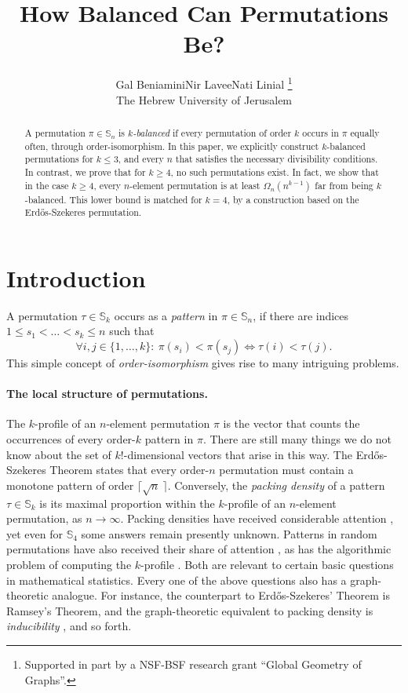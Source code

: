 \documentclass{article}
\title{How Balanced Can Permutations Be?}
\author{Gal Beniamini\qquad Nir Lavee\qquad Nati Linial
\thanks{Supported in part by a NSF-BSF research grant ``Global Geometry of Graphs''.}
\vspace {0.1cm} \\\small The Hebrew University of Jerusalem}
\date{}
\newcommand{\Sn}{\mathbb{S}_n}
\newcommand{\ESZ}{Erd\H{o}s-Szekeres\xspace}
\theoremstyle{remark}
\theoremstyle{plain}
\begin{document}
\maketitle

\vspace{-0.45cm}
\begin{abstract}
A permutation $\pi \in \Sn$ is {\em $k$-balanced} if every permutation of order $k$ occurs in $\pi$ equally often, through order-isomorphism.
In this paper, we explicitly construct $k$-balanced permutations for $k \le 3$, and every $n$
that satisfies the necessary divisibility conditions.
In contrast, we prove that for $k \ge 4$, no such permutations exist.  
In fact, we show that in the case $k \ge 4$, every $n$-element permutation is at least $\Omega_n(n^{k-1})$
far from being $k$-balanced.
This lower bound is matched for $k=4$, by a construction based on the \ESZ permutation.

\end{abstract}

\section{Introduction}
\label{section:introduction}
A permutation $\tau \in \mathbb{S}_k$ occurs as a \textit{pattern} in
$\pi \in \Sn$, if there are indices $1\le s_1 < \dots < s_k\le n$
such that $$\forall i,j \in \{1, \dots, k\}:\ \pi(s_i) < \pi(s_j) \iff \tau(i) < \tau(j).$$
This simple concept of \textit{order-isomorphism} gives rise to many intriguing problems.

\paragraph{The local structure of permutations.}
The $k$-profile of an $n$-element permutation $\pi$
is the vector that counts the occurrences
of every order-$k$ pattern in $\pi$. There are still many things we do not know about
the set of $k!$-dimensional vectors that arise in this way.
The \ESZ Theorem \cite{erdos1935combinatorial} 
states that every order-$n$
permutation must contain a monotone pattern of order
$\lceil\sqrt{n}~\rceil$.
Conversely, the \textit{packing density} of a pattern $\tau \in \mathbb{S}_k$
is its maximal proportion within the $k$-profile of an $n$-element
permutation, as $n \to \infty$. 
Packing densities have received considerable attention \cite{albert2002packing,sliacan2018improving,wilf2002patterns},
yet even for $\mathbb{S}_4$ some answers remain presently unknown. 
Patterns in random permutations have also received their share of attention \cite{even2020patterns, janson2013asymptotic}, as has the algorithmic problem of computing the $k$-profile \cite{even2021counting,dudek2020counting}. Both are relevant to certain basic questions in mathematical statistics. Every one of the above questions also has a graph-theoretic analogue.
For instance, the counterpart to \ESZ' Theorem is Ramsey's Theorem, and the graph-theoretic equivalent to packing density is \emph{inducibility} \cite{pippenger1975inducibility}, and so forth.
\end{document}
